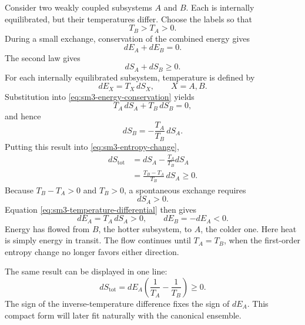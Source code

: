 Consider two weakly coupled subsystems \(A\) and \(B\). Each is internally
equilibrated, but their temperatures differ. Choose the labels so that
\begin{equation}
 T_B>T_A>0.
 \label{eq:sm3-temperature-order}
\end{equation}
During a small exchange, conservation of the combined energy gives
\begin{equation}
 dE_A+dE_B=0.
 \label{eq:sm3-energy-conservation}
\end{equation}
The second law gives
\begin{equation}
 dS_A+dS_B\geq0.
 \label{eq:sm3-entropy-change}
\end{equation}
For each internally equilibrated subsystem, temperature is defined by
\begin{equation}
 dE_X=T_X\,dS_X,
 \qquad X=A,B.
 \label{eq:sm3-temperature-differential}
\end{equation}
Substitution into \eqref{eq:sm3-energy-conservation} yields
\begin{equation}
 T_A\,dS_A+T_B\,dS_B=0,
\end{equation}
and hence
\begin{equation}
 dS_B=-\frac{T_A}{T_B}\,dS_A.
 \label{eq:sm3-dsb}
\end{equation}
Putting this result into \eqref{eq:sm3-entropy-change},
\begin{align}
 dS_{\mathrm{tot}}
 &=dS_A-\frac{T_A}{T_B}dS_A\\
 &=\frac{T_B-T_A}{T_B}\,dS_A\geq0.
 \label{eq:sm3-flow-entropy}
\end{align}
Because \(T_B-T_A>0\) and \(T_B>0\), a spontaneous exchange requires
\[
 dS_A>0.
\]
Equation \eqref{eq:sm3-temperature-differential} then gives
\begin{equation}
 dE_A=T_A\,dS_A>0,
 \qquad
 dE_B=-dE_A<0.
 \label{eq:sm3-hot-to-cold}
\end{equation}
Energy has flowed from \(B\), the hotter subsystem, to \(A\), the colder one.
Here heat is simply energy in transit. The flow continues until
\(T_A=T_B\), when the first-order entropy change no longer favors either
direction.

The same result can be displayed in one line:
\begin{equation}
 dS_{\mathrm{tot}}
 =dE_A\left(\frac{1}{T_A}-\frac{1}{T_B}\right)\geq0.
 \label{eq:sm3-compact-flow}
\end{equation}
The sign of the inverse-temperature difference fixes the sign of \(dE_A\).
This compact form will later fit naturally with the canonical ensemble.

